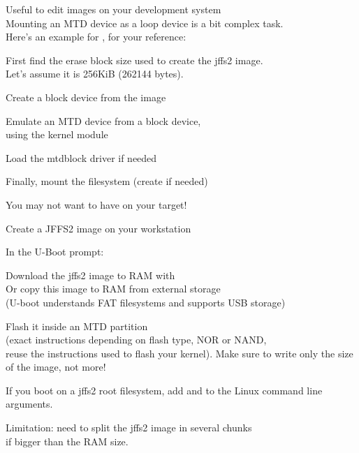   Useful to edit  images on your development system\\
  Mounting an MTD device as a loop device is a bit complex task.\\
  Here's an example for , for your reference:
  \startitemize
  \item First find the erase block size used to create the jffs2 image.\\
    Let's assume it is 256KiB (262144 bytes).
  \item Create a block device from the image\\
  \item Emulate an MTD device from a block device,\\
    using the  kernel module\\
  \item Load the mtdblock driver if needed\\
  \item Finally, mount the filesystem (create  if needed)\\
  \stopitemize

  You may not want to have  on your target!
  \startitemize
  \item Create a JFFS2 image on your workstation
  \item In the U-Boot prompt:
    \startitemize
    \item Download the jffs2 image to RAM with \\
      Or copy this image to RAM from external storage\\
      (U-boot understands FAT filesystems and supports USB storage)
    \item Flash it inside an MTD partition\\
      (exact instructions depending on flash type, NOR or NAND,\\
      reuse the instructions used to flash your kernel). Make sure to
      write only the size of the image, not more!
    \item If you boot on a jffs2 root filesystem, add
       and  to the
      Linux command line arguments.
    \stopitemize
  \item Limitation: need to split the jffs2 image in several chunks\\
    if bigger than the RAM size.
  \stopitemize

